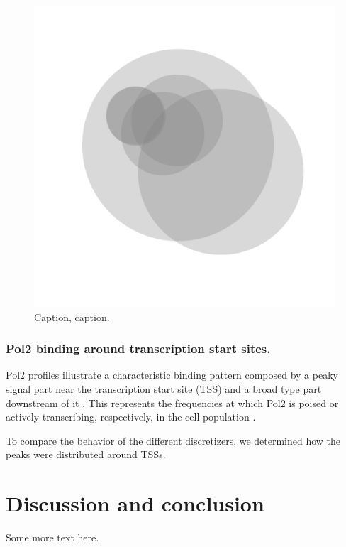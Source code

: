 \documentclass{bioinfo}
\begin{document}
\begin{figure}[!tpb]
    \centerline{\includegraphics[scale=0.5]{histone_venn_gray.pdf}}
\caption{Caption, caption.}\label{fig:venn}
\end{figure}

\subsubsection{Pol2 binding around transcription start sites.}
Pol2 profiles illustrate a characteristic binding pattern composed by a peaky
signal part near the transcription start site (TSS) and a broad type part
downstream of it \citep{pmid}. This represents the frequencies
at which Pol2 is poised or actively transcribing, respectively,
in the cell population \citep{pmid}.

To compare the behavior of the different discretizers, we determined how the
peaks were distributed around TSSs.



\section{Discussion and conclusion}
Some more text here.
\end{document}
